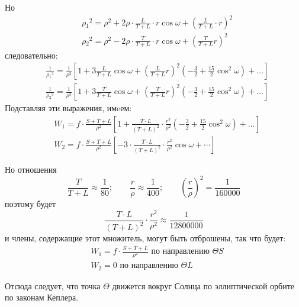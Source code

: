 \documentclass[a4paper,12pt]{book}
\begin{document}
Но
%
\begin{equation*}
	\begin{aligned}
		&\rho{_1}^2 = \rho^2 + 2\rho \cdot \frac{L}{T+L} \cdot r\cos\omega+\left(\frac{L}{T+L} \cdot r \right)^2 \\
		&\rho{_2}^2 = \rho^2-2\rho \cdot \frac{T}{T+L} \cdot r\cos\omega+\left(\frac{T}{T+L}r\right)^2
	\end{aligned}
\end{equation*}
%
следовательно:
%
\begin{equation*}
\begin{aligned}
& \frac{1}{\rho{_1}^3} = \frac{1}{\rho^3}
	\left[
		1+3\frac{L}{T+L}\cos\omega+
		\left(
			\frac{L}{T+L}r
		\right)^2
		\left(
			-\frac{3}{2}+\frac{15}{2}\cos^2\omega
		\right) + \dots
	\right]
	\\
& \frac{1}{\rho{_2}^3}=\frac{1}{\rho^3}
	\left[
		1+3\frac{T}{T+L}\cos\omega+
		\left(
			\frac{T}{T+L}r
		\right)^2
		\left(
			-\frac{3}{2}+\frac{15}{2}\cos^2\omega
		\right)
		+ \dots
	\right]
\end{aligned}
\end{equation*}
%
Подставляя эти выражения, имeем:
%
\begin{equation*}
\begin{aligned}
	& W_1=f \cdot \frac{S+T+L}{\rho^2}
		\left[
			1+\frac{T \cdot L}{\left(T+L\right)^2} \cdot \frac{r^2}{\rho^2}
			\left(
				-\frac{3}{2}+\frac{15}{2}\cos^2\omega
			\right) + \dots
		\right]
	\\
	& W_2=f \cdot \frac{S+T+L}{\rho^2}
		\left[
			-3 \cdot \frac{T \cdot L}{(T+L)^2} \cdot \frac{r^2}{\rho^2}\cos\omega+\cdots
		\right]
\end{aligned}
\end{equation*}

Но отношения
%
\[\frac{T}{T+L} \approx \frac{1}{80}; \qquad \frac{r}{\rho} \approx \frac{1}{400}; \qquad \left(\frac{r}{\rho}\right)^2 = \frac{1}{160000}\]
%
поэтому будет
%
\[\frac{T \cdot L}{\left(T+L\right)^2} \cdot \frac{r^2}{\rho^2} \approx \frac{1}{12800000}\]
%
и члены, содержащие этот множитель, могут быть отброшены, так что будет:
%
\begin{equation*}
\begin{aligned}
	& W_1=f \cdot \frac{S+T+L}{\rho^2} \text{ по направлению } \Theta S
	\\
	& W_2=0  \text{ по направлению } \Theta L
\end{aligned}
\end{equation*}


Отсюда следует, что точка $\Theta$ движется вокруг Солнца по эллиптической орбите по законам Кеплера.
\end{document}
